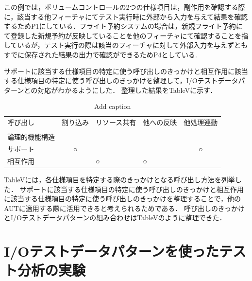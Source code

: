 この例では，ボリュームコントロールの2つの仕様項目は，副作用を確認する際に，該当する他フィーチャにてテスト実行時に外部から入力を与えて結果を確認するためP1にしている．フライト予約システムの場合は，新規フライト予約にて登録した新規予約が反映していることを他のフィーチャにて確認することを指しているが，テスト実行の際は該当のフィーチャに対して外部入力を与えずともすでに保存された結果の出力で確認ができるためP4としている.

サポートに該当する仕様項目の特定に使う呼び出しのきっかけと相互作用に該当する仕様項目の特定に使う呼び出しのきっかけを整理して，I/Oテストデータパターンとの対応がわかるようにした．
整理した結果をTableVに示す．
\begin{table}[htbp]
  \centering
  \caption{Add caption}
    \begin{tabular}{|p{4em}|c|p{4em}|p{4em}|c|}
    \hline
    呼び出し  & \multicolumn{1}{p{4em}|}{割り込み} & リソース共有 & 他への反映 & \multicolumn{1}{p{4em}|}{他処理連動} \bigstrut[t]\\
    \multicolumn{1}{|l|}{} &       & \multicolumn{1}{r|}{} & \multicolumn{1}{r|}{} &  \\
    論理的機能構造 &       & \multicolumn{1}{r|}{} & \multicolumn{1}{r|}{} &  \bigstrut[b]\\
    \hline
    サポート  & \multicolumn{1}{p{4em}|}{○} & \multicolumn{1}{c|}{} & \multicolumn{1}{c|}{} & \multicolumn{1}{p{4em}|}{○} \bigstrut\\
    \hline
    相互作用  &       & ○     & ○     &  \bigstrut\\
    \hline
    \end{tabular}%
  \label{tab:addlabel}%
\end{table}%

TableVには，各仕様項目を特定する際のきっかけとなる呼び出し方法を列挙した．
サポートに該当する仕様項目の特定に使う呼び出しのきっかけと相互作用に該当する仕様項目の特定に使う呼び出しのきっかけを整理することで，他のAUTに適用する際に活用できると考えられるためである．
呼び出しのきっかけとI/Oテストデータパターンの組み合わせはTableVのように整理できた．

\newpage
\section{I/Oテストデータパターンを使ったテスト分析の実験} \label{sec:4-2}

